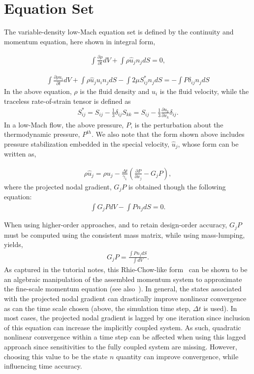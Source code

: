\documentclass{article}
\begin{document}
\section{Equation Set}
The variable-density low-Mach equation set is defined by the continuity and momentum equation, here shown in
integral form,

\begin{align}
 \int  \frac {\partial \rho }{\partial t} dV + \int \rho \hat{u}_j n_j dS = 0,
\label{eq:contEq}
\end{align} 

\begin{align}
\int  \frac {\partial \rho u_i }{\partial t} dV + \int \rho \hat{u}_j u_i n_j dS 
-\int 2 \mu S^*_{ij} n_j dS = -\int P \delta_{ij} n_j dS
\label{eq:momEq}
\end{align}
%
In the above equation, $\rho$ is the fluid density and $u_i$ is the fluid velocity, while
the traceless rate-of-strain tensor is defined as
\begin{align}
S^*_{ij}  = S_{ij} - \frac{1}{3} \delta_{ij} S_{kk} \nonumber
		     = S_{ij} - \frac{1}{3} \frac{\partial  u_k }{\partial x_k}\delta_{ij}.
\end{align}
In a low-Mach flow, the above pressure, $P$, is the perturbation about the thermodynamic
pressure, $P^{th}$. We also note that the form shown above includes pressure stabilization
embedded in the special velocity, $\hat{u}_j$, whose form can be written as,

\begin{align}
\rho \hat{u}_j = \rho u_j -\frac{\Delta t}{\gamma_1}\left(\frac{\partial P}{\partial x_j} - G_j P\right),
\end{align}
where the projected nodal gradient, $G_jP$ is obtained though the following equation:
\begin{align}
\int G_j P dV - \int P n_j dS = 0.
\end{align}

When using higher-order approaches, and to retain design-order accuracy, $G_jP$ must be computed
using the consistent mass matrix, while using mass-lumping, yields,
\begin{align}
G_j P = \frac{\int P n_j dS}{\int dV}.
\end{align}
As captured in the tutorial notes, this Rhie-Chow-like form~\cite{rhieChow1983} can be shown to be an algebraic manipulation of the
assembled momentum system to approximate the fine-scale momentum equation (see also~\cite{martinez2017}). In general, the
states associated with the projected nodal gradient can drastically improve nonlinear convergence as can the time scale chosen 
(above, the simulation time step, $\Delta t$ is used). In most cases, the projected nodal gradient is lagged by one iteration since inclusion of this
equation can increase the implicitly coupled system. As such, quadratic nonlinear convergence
within a time step can be affected when using this lagged approach since sensitivities to the fully coupled system are missing. However, 
choosing this value to be the state $n$ quantity can improve convergence, while influencing time accuracy. 
\end{document}
